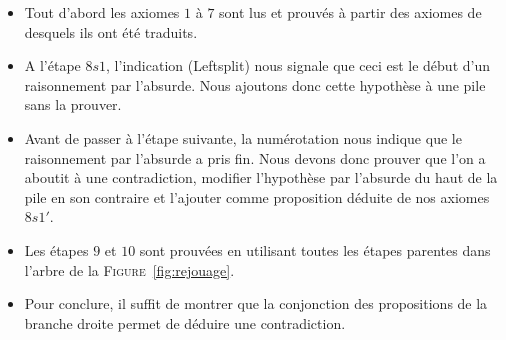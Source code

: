 \begin{itemize}
\item Tout d'abord les axiomes $1$ à $7$ sont lus et prouvés à partir des axiomes de \holfour desquels ils ont été traduits.
\item A l'étape $8s1$, l'indication (Leftsplit) nous signale que ceci est le début d'un raisonnement par l'absurde. Nous ajoutons donc cette hypothèse à une pile sans la prouver.
\item Avant de passer à l'étape suivante, la numérotation nous indique que le raisonnement par l'absurde a pris fin. Nous devons donc prouver que l'on a aboutit à une contradiction, modifier l'hypothèse par l'absurde du haut de la pile en son contraire et l'ajouter comme proposition déduite de nos axiomes $8s1'$.
\item Les étapes $9$ et $10$ sont prouvées en utilisant toutes les étapes parentes dans l'arbre de la \textsc{Figure}~\ref{fig:rejouage}.
\item Pour conclure, il suffit de montrer que la conjonction des propositions de la branche droite permet de déduire une contradiction.
\end{itemize}





